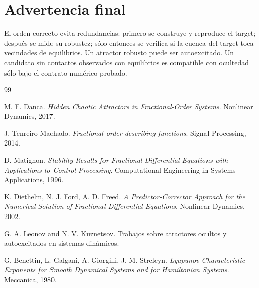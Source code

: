 \documentclass[11pt]{article}
\begin{document}
\section{Advertencia final}

El orden correcto evita redundancias: primero se construye y reproduce el target; después se mide su robustez; sólo entonces se verifica si la cuenca del target toca vecindades de equilibrios. Un atractor robusto puede ser autoexcitado. Un candidato sin contactos observados con equilibrios es compatible con ocultedad sólo bajo el contrato numérico probado.

\begin{thebibliography}{99}

M. F. Danca.
\emph{Hidden Chaotic Attractors in Fractional-Order Systems}.
Nonlinear Dynamics, 2017.

J. Tenreiro Machado.
\emph{Fractional order describing functions}.
Signal Processing, 2014.

D. Matignon.
\emph{Stability Results for Fractional Differential Equations with Applications to Control Processing}.
Computational Engineering in Systems Applications, 1996.

K. Diethelm, N. J. Ford, A. D. Freed.
\emph{A Predictor-Corrector Approach for the Numerical Solution of Fractional Differential Equations}.
Nonlinear Dynamics, 2002.

G. A. Leonov and N. V. Kuznetsov.
Trabajos sobre atractores ocultos y autoexcitados en sistemas dinámicos.

G. Benettin, L. Galgani, A. Giorgilli, J.-M. Strelcyn.
\emph{Lyapunov Characteristic Exponents for Smooth Dynamical Systems and for Hamiltonian Systems}.
Meccanica, 1980.

\end{thebibliography}
\end{document}
